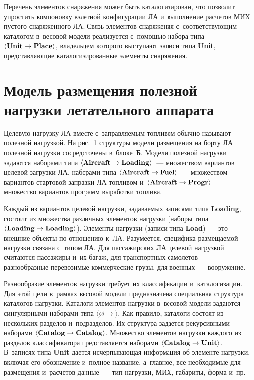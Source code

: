 \begin{multicols}{2}
  Перечень элементов снаряжения может быть каталогизирован, что позволит 
упростить компоновку взлетной конфигурации ЛА и~выполнение расчетов 
МИХ пустого снаряженного ЛА. Связь элементов снаряжения 
с~соответствующим каталогом в~весовой модели реализуется с~помощью 
набора типа 
$\langle \mbox{\textbf{Unit}}\hm \to \mbox{\textbf{Place}}\rangle$, 
владельцем которого выступают записи типа \textbf{Unit}, 
представляющие каталогизированные элементы снаряжения.

  
\section{Модель размещения полезной нагрузки летательного аппарата}


  Целевую нагрузку ЛА вместе с~заправляемым топливом обычно называют 
полезной нагрузкой. На рис.~1 структуры модели размещения на борту ЛА 
полезной нагрузки сосредоточены в~блоке~\textbf{Б}. Модели полезной 
нагрузки задаются наборами типа 
$\langle \mbox{\textbf{Aircraft}}\hm \to \mbox{\textbf{Loading}}\rangle$~--- 
множеством вариантов целевой загрузки ЛА, наборами типа 
$\langle \mbox{\textbf{Aircraft}}\hm \to \mbox{\textbf{Fuel}}\rangle$~--- 
множеством вариантов стартовой заправки ЛА топливом 
и~$\langle \mbox{\textbf{Aircraft}}\hm \to \mbox{\textbf{Progr}}\rangle$~---  
множество вариантов программ выработки топлива.
  
  Каждый из вариантов целевой нагрузки, задаваемых записями типа 
\textbf{Loading}, состоит из множества различных элементов нагрузки 
(наборы типа 
$\langle \mbox{\textbf{Loading}}\hm \to \mbox{\textbf{Loading}}\rangle$). 
Элементы нагрузки (записи типа \textbf{Load})~--- это внешние 
объекты по отношению к~ЛА. Разумеется, специфика размещаемой нагрузки 
связана с~типом ЛА. Для пассажирских ЛА целевой нагрузкой считаются 
пассажиры и~их багаж, для транспортных самолетов~--- разнообразные 
перевозимые коммерческие грузы, для военных~---  вооружение. 


Разнообразие элементов нагрузки требует их классификации и~каталогизации. 
Для этой цели в~рамках весовой модели предназначена специальная структура 
каталогов нагрузки. Каталоги элементов нагрузки в~весовой модели задаются 
сингулярными наборами типа 
$\langle$$\varnothing$\;$\to$$\rangle$. Как правило, 
каталоги состоят из нескольких разделов и~подразделов. Их структура задается 
рекурсивными наборами 
$\langle\mbox{\textbf{Catalog}}\hm\to \mbox{\textbf{Catalog}}\rangle$. 
Множество элементов нагрузки каждого из разделов классификатора 
представляется наборами 
$\langle \mbox{\textbf{Catalog}}\hm \to \mbox{\textbf{Unit}}\rangle$. 
В~записях типа \textbf{Unit} дается исчерпывающая информация об 
элементе нагрузки, включая его обозначение и~полное название, а~главное, все 
необходимые для размещения и~расчетов данные~--- тип нагрузки, МИХ, 
габариты, форма и~пр. 


\end{multicols}
